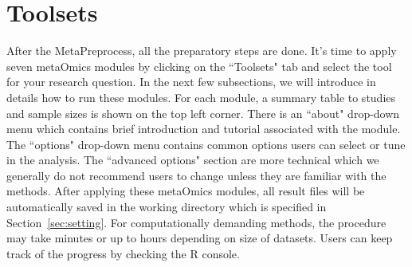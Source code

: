 \section{Toolsets}

After the MetaPreprocess,
all the preparatory steps are done. 
It's time to apply seven metaOmics modules by clicking on the ``Toolsets" tab and select the tool for your research question.
In the next few subsections, 
we will introduce in details how to run these modules.
For each module, a summary table to studies and sample sizes is shown on the top left corner. 
There is an ``about" drop-down menu which contains brief introduction and tutorial associated with the module.
The ``options" drop-down menu contains common options users can select or tune in the analysis.
The ``advanced options" section are more technical which we generally do not recommend users to change unless they are familiar with the methods.
After applying these metaOmics modules, all result files will be automatically saved in the working directory which is specified in Section~\ref{sec:setting}.
For computationally demanding methods, the procedure may take minutes or up to hours depending on size of datasets.
Users can keep track of the progress by checking the R console.






